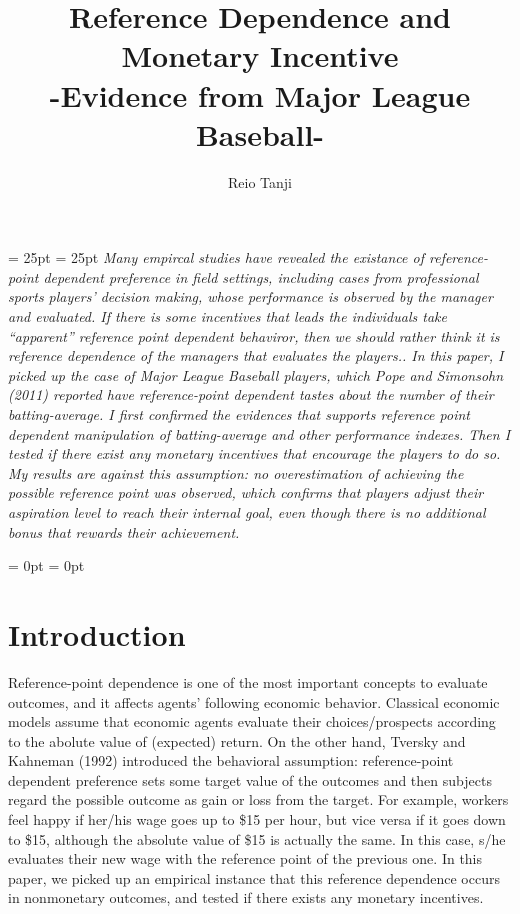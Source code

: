 \documentclass[dvipdfmx, 12pt]{article}
\begin{document}
\title{Reference Dependence and Monetary Incentive \\
-Evidence from Major League Baseball-}
\author{Reio Tanji}
\date{}
\maketitle

\leftskip = 25pt
\rightskip = 25pt
  \small
  \textit{
  Many empircal studies have revealed the existance of reference-point dependent preference in field settings, including cases from professional sports players' decision making, whose performance is observed by the manager and evaluated. If there is some incentives that leads the individuals take ``apparent'' reference point dependent behaviror, then we should rather think it is reference dependence of the managers that evaluates the players.. In this paper, I picked up the case of Major League Baseball players, which Pope and Simonsohn (2011) reported have reference-point dependent tastes about the number of their batting-average. I first confirmed the evidences that supports reference point dependent manipulation of batting-average and other performance indexes. Then I tested if there exist any monetary incentives that encourage the players to do so. My results are against this assumption: no overestimation of achieving the possible reference point was observed, which confirms that players adjust their aspiration level to reach their internal goal, even though there is no additional bonus that rewards their achievement.
  }



\leftskip = 0pt
\rightskip = 0pt
\normalsize


\section{Introduction}

Reference-point dependence is one of the most important concepts to evaluate outcomes, and it affects agents' following economic behavior. Classical economic models assume that economic agents evaluate their choices/prospects according to the abolute value of (expected) return. On the other hand, Tversky and Kahneman (1992) introduced the behavioral assumption: reference-point dependent preference sets some target value of the outcomes and then subjects regard the possible outcome as gain or loss from the target. For example, workers feel happy if her/his wage goes up to \$15 per hour, but vice versa if it goes down to \$15, although the absolute value of \$15 is actually the same. In this case, s/he evaluates their new wage with the reference point of the previous one. In this paper, we picked up an empirical instance that this reference dependence occurs in nonmonetary outcomes, and tested if there exists any monetary incentives.
\end{document}
